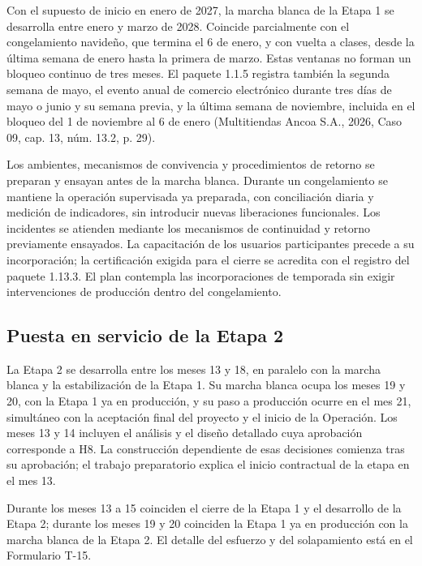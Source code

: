 \documentclass[11pt]{article}
\begin{document}
Con el supuesto de inicio en enero de 2027, la marcha blanca de la Etapa 1 se desarrolla entre enero y marzo de 2028. Coincide parcialmente con el congelamiento navideño, que termina el 6 de enero, y con vuelta a clases, desde la última semana de enero hasta la primera de marzo. Estas ventanas no forman un bloqueo continuo de tres meses. El paquete 1.1.5 registra también la segunda semana de mayo, el evento anual de comercio electrónico durante tres días de mayo o junio y su semana previa, y la última semana de noviembre, incluida en el bloqueo del 1 de noviembre al 6 de enero (Multitiendas Ancoa S.A., 2026, Caso 09, cap. 13, núm. 13.2, p. 29).

Los ambientes, mecanismos de convivencia y procedimientos de retorno se preparan y ensayan antes de la marcha blanca. Durante un congelamiento se mantiene la operación supervisada ya preparada, con conciliación diaria y medición de indicadores, sin introducir nuevas liberaciones funcionales. Los incidentes se atienden mediante los mecanismos de continuidad y retorno previamente ensayados. La capacitación de los usuarios participantes precede a su incorporación; la certificación exigida para el cierre se acredita con el registro del paquete 1.13.3. El plan contempla las incorporaciones de temporada sin exigir intervenciones de producción dentro del congelamiento.

\subsection*{Puesta en servicio de la Etapa 2}

La Etapa 2 se desarrolla entre los meses 13 y 18, en paralelo con la marcha blanca y la estabilización de la Etapa 1. Su marcha blanca ocupa los meses 19 y 20, con la Etapa 1 ya en producción, y su paso a producción ocurre en el mes 21, simultáneo con la aceptación final del proyecto y el inicio de la Operación. Los meses 13 y 14 incluyen el análisis y el diseño detallado cuya aprobación corresponde a H8. La construcción dependiente de esas decisiones comienza tras su aprobación; el trabajo preparatorio explica el inicio contractual de la etapa en el mes 13.

Durante los meses 13 a 15 coinciden el cierre de la Etapa 1 y el desarrollo de la Etapa 2; durante los meses 19 y 20 coinciden la Etapa 1 ya en producción con la marcha blanca de la Etapa 2. El detalle del esfuerzo y del solapamiento está en el Formulario T-15.
\end{document}
